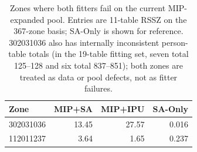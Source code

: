 \begin{table}[h!]
\centering
\caption{Zones where both fitters fail on the current MIP-expanded pool.
Entries are 11-table RSSZ on the 367-zone basis; SA-Only is shown for
reference. 302031036 also has internally inconsistent person-table totals (in
the 19-table fitting set, seven total 125--128 and six total 837--851); both
zones are treated as data or pool defects, not as fitter failures.}
\label{tab:pathological_zones}
\footnotesize
\begin{tabular}{@{}lrrr@{}}
\toprule
Zone & MIP+SA & MIP+IPU & SA-Only \\
\midrule
302031036 & 13.45 & 27.57 & 0.016 \\
112011237 & 3.64 & 1.65 & 0.237 \\
\bottomrule
\end{tabular}
\end{table}
